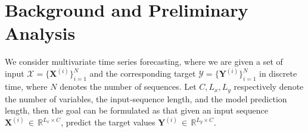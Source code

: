 \documentclass[sigconf,anonymous,review]{acmart}
\begin{document}




\section{Background and Preliminary Analysis}
\label{sec:Preliminary Analysis}

We consider multivariate time series forecasting, where we are 
given a set of input $\mathcal{X}=\{\mathbf{X}^{(i)}\}_{i=1}^N$ and the corresponding target $\mathcal{Y}=\{\mathbf{Y}^{(i)}\}_{i=1}^N$ in discrete time, where $N$ denotes the number of sequences.
Let $C, L_x,  L_y$ respectively denote the number of variables, the input‐sequence length, and the model prediction length, then the goal can be formulated as that given an input sequence
$\mathbf{X}^{(i)} \,\in\, \mathbb{R}^{ L_x \times C}$, predict the target values
$\mathbf{Y}^{(i)} \,\in\, \mathbb{R}^{L_y \times C}$.
\end{document}
